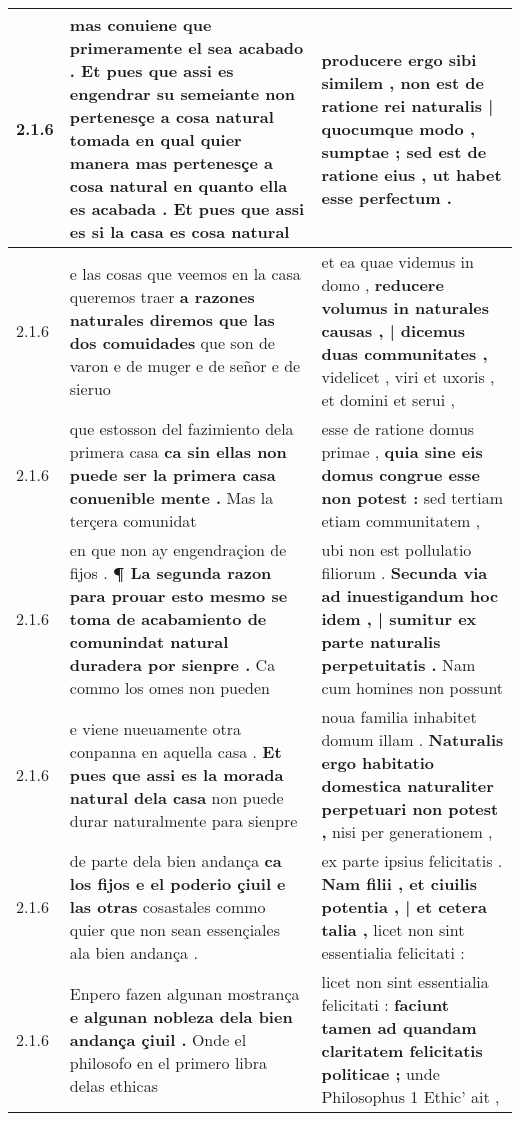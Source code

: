 \begin{tabular}{|p{1cm}|p{6.5cm}|p{6.5cm}|}
2.1.6 & mas conuiene que primeramente el sea acabado . \textbf{ Et pues que assi es engendrar su semeiante non pertenesçe a cosa natural tomada en qual quier manera mas pertenesçe a cosa natural en quanto ella es acabada . } Et pues que assi es si la casa es cosa natural & producere ergo sibi similem , \textbf{ non est de ratione rei naturalis | quocumque modo , sumptae ; sed est de ratione eius , } ut habet esse perfectum . \\\hline
2.1.6 & e las cosas que veemos en la casa queremos traer \textbf{ a razones naturales diremos que las dos comuidades } que son de varon e de muger e de señor e de sieruo & et ea quae videmus in domo , \textbf{ reducere volumus in naturales causas , | dicemus duas communitates , } videlicet , viri et uxoris , et domini et serui , \\\hline
2.1.6 & que estosson del fazimiento dela primera casa \textbf{ ca sin ellas non puede ser la primera casa conuenible mente . } Mas la terçera comunidat & esse de ratione domus primae , \textbf{ quia sine eis domus congrue esse non potest : } sed tertiam etiam communitatem , \\\hline
2.1.6 & en que non ay engendraçion de fijos . \textbf{ ¶ La segunda razon para prouar esto mesmo se toma de acabamiento de comunindat natural duradera por sienpre . } Ca commo los omes non pueden & ubi non est pollulatio filiorum . \textbf{ Secunda via ad inuestigandum hoc idem , | sumitur ex parte naturalis perpetuitatis . } Nam cum homines non possunt \\\hline
2.1.6 & e viene nueuamente otra conpanna en aquella casa . \textbf{ Et pues que assi es la morada natural dela casa } non puede durar naturalmente para sienpre & noua familia inhabitet domum illam . \textbf{ Naturalis ergo habitatio domestica naturaliter perpetuari non potest , } nisi per generationem , \\\hline
2.1.6 & de parte dela bien andança \textbf{ ca los fijos e el poderio çiuil e las otras } cosastales commo quier que non sean essençiales ala bien andança . & ex parte ipsius felicitatis . \textbf{ Nam filii , et ciuilis potentia , | et cetera talia , } licet non sint essentialia felicitati : \\\hline
2.1.6 & Enpero fazen algunan mostrança \textbf{ e algunan nobleza dela bien andança çiuil . } Onde el philosofo en el primero libra delas ethicas & licet non sint essentialia felicitati : \textbf{ faciunt tamen ad quandam claritatem felicitatis politicae ; } unde Philosophus 1 Ethic’ ait , \\\hline

\end{tabular}
